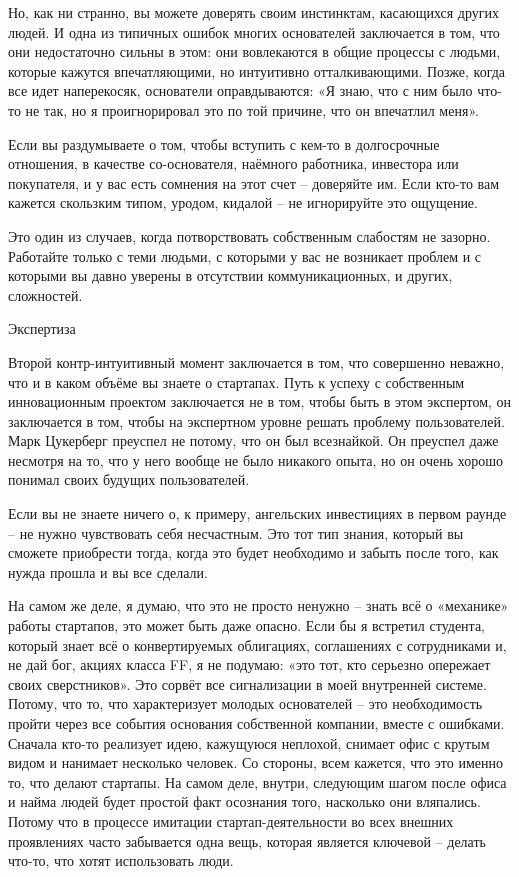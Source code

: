 \documentclass[ebook,12pt,oneside,openany]{memoir}
\begin{document}
Но, как ни странно, вы можете доверять своим инстинктам, касающихся
других людей. И одна из типичных ошибок многих основателей заключается
в том, что они недостаточно сильны в этом: они вовлекаются в общие
процессы с людьми, которые кажутся впечатляющими, но интуитивно
отталкивающими. Позже, когда все идет наперекосяк, основатели
оправдываются: «Я знаю, что с ним было что-то не так, но я
проигнорировал это по той причине, что он впечатлил меня».

Если вы раздумываете о том, чтобы вступить с кем-то в долгосрочные
отношения, в качестве со-основателя, наёмного работника, инвестора или
покупателя, и у вас есть сомнения на этот счет – доверяйте им. Если
кто-то вам кажется скользким типом, уродом, кидалой – не игнорируйте
это ощущение.

Это один из случаев, когда потворствовать собственным слабостям не
зазорно. Работайте только с теми людьми, с которыми у вас не возникает
проблем и с которыми вы давно уверены в отсутствии коммуникационных, и
других, сложностей.

Экспертиза

Второй контр-интуитивный момент заключается в том, что совершенно
неважно, что и в каком объёме вы знаете о стартапах. Путь к успеху с
собственным инновационным проектом заключается не в том, чтобы быть в
этом экспертом, он заключается в том, чтобы на экспертном уровне
решать проблему пользователей. Марк Цукерберг преуспел не потому, что
он был всезнайкой. Он преуспел даже несмотря на то, что у него вообще
не было никакого опыта, но он очень хорошо понимал своих будущих
пользователей.

Если вы не знаете ничего о, к примеру, ангельских инвестициях в первом
раунде – не нужно чувствовать себя несчастным. Это тот тип знания,
который вы сможете приобрести тогда, когда это будет необходимо и
забыть после того, как нужда прошла и вы все сделали.

На самом же деле, я думаю, что это не просто ненужно – знать всё о
«механике» работы стартапов, это может быть даже опасно. Если бы я
встретил студента, который знает всё о конвертируемых облигациях,
соглашениях с сотрудниками и, не дай бог, акциях класса FF, я не
подумаю: «это тот, кто серьезно опережает своих сверстников». Это
сорвёт все сигнализации в моей внутренней системе. Потому, что то, что
характеризует молодых основателей – это необходимость пройти через все
события основания собственной компании, вместе с ошибками. Сначала
кто-то реализует идею, кажущуюся неплохой, снимает офис с крутым видом
и нанимает несколько человек. Со стороны, всем кажется, что это именно
то, что делают стартапы. На самом деле, внутри, следующим шагом после
офиса и найма людей будет простой факт осознания того, насколько они
вляпались. Потому что в процессе имитации стартап-деятельности во всех
внешних проявлениях часто забывается одна вещь, которая является
ключевой – делать что-то, что хотят использовать люди.
\end{document}

